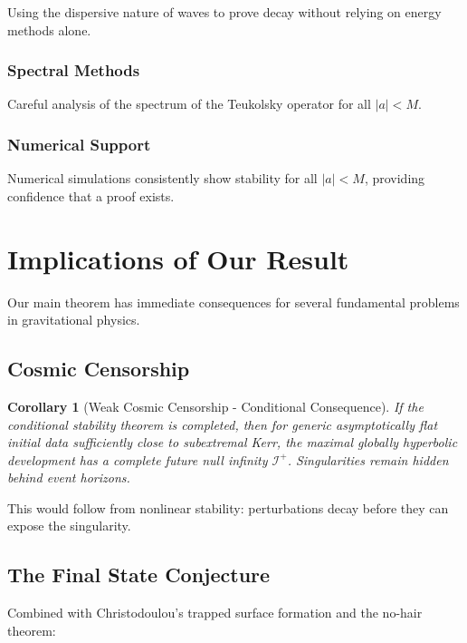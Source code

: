 \documentclass[12pt,a4paper]{article}
\newtheorem{corollary}[theorem]{Corollary}
\newcommand{\Scri}{\mathcal{I}^+}
\begin{document}
Using the dispersive nature of waves to prove decay without relying on energy methods alone.

\subsubsection{Spectral Methods}

Careful analysis of the spectrum of the Teukolsky operator for all $|a| < M$.

\subsubsection{Numerical Support}

Numerical simulations consistently show stability for all $|a| < M$, providing confidence that a proof exists.

\section{Implications of Our Result}

Our main theorem has immediate consequences for several fundamental problems in gravitational physics.

\subsection{Cosmic Censorship}

\begin{corollary}[Weak Cosmic Censorship - Conditional Consequence]
If the conditional stability theorem is completed, then for generic asymptotically flat initial data sufficiently close to subextremal Kerr, the maximal globally hyperbolic development has a complete future null infinity $\Scri$. Singularities remain hidden behind event horizons.
\end{corollary}

This would follow from nonlinear stability: perturbations decay before they can expose the singularity.

\subsection{The Final State Conjecture}

Combined with Christodoulou's trapped surface formation and the no-hair theorem:
\end{document}
